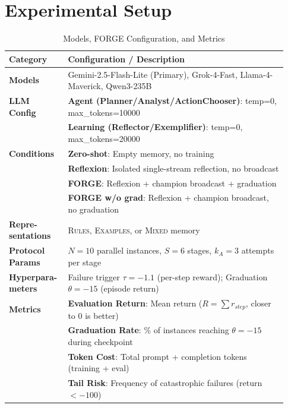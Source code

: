\documentclass[sigconf]{acmart}
\begin{document}
\section{Experimental Setup}
\begin{table}[h!]
  \small
  \centering
  \caption{Models, FORGE Configuration, and Metrics}
  \label{tab:setup_summary}
  \begin{tabular}{p{0.18\linewidth} p{0.75\linewidth}}
  \toprule
  \textbf{Category} & \textbf{Configuration / Description} \\
  \midrule
  \textbf{Models} & Gemini-2.5-Flash-Lite (Primary), Grok-4-Fast, Llama-4-Maverick, Qwen3-235B \\
  \textbf{LLM Config} & \textbf{Agent (Planner/Analyst/ActionChooser)}: temp=0, max\_tokens=10000 \\
                      & \textbf{Learning (Reflector/Exemplifier)}: temp=0, max\_tokens=20000 \\
  \textbf{Conditions} & \textbf{Zero-shot}: Empty memory, no training \\
                      & \textbf{Reflexion}: Isolated single-stream reflection, no broadcast \\
                      & \textbf{FORGE}: Reflexion + champion broadcast + graduation \\
                      & \textbf{FORGE w/o grad}: Reflexion + champion broadcast, no graduation \\
  \textbf{Repre-sentations} & \textsc{Rules}, \textsc{Examples}, or \textsc{Mixed} memory \\
  \addlinespace
  \textbf{Protocol Params} & $N=10$ parallel instances, $S=6$ stages, $k_A=3$ attempts per stage \\
  \textbf{Hyperpara-meters} & Failure trigger $\tau = -1.1$ (per-step reward); Graduation $\theta = -15$ (episode return) \\
  \addlinespace
  \textbf{Metrics} & \textbf{Evaluation Return}: Mean return ($R=\sum r_{step}$, closer to 0 is better) \\
                   & \textbf{Graduation Rate}: \% of instances reaching $\theta=-15$ during checkpoint \\
                   & \textbf{Token Cost}: Total prompt + completion tokens (training + eval) \\
                   & \textbf{Tail Risk}: Frequency of catastrophic failures (return $< -100$) \\
  \bottomrule
  \end{tabular}
\end{table}
\end{document}

